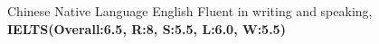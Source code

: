\begin{cvhonors}
  \cvhonor
    {Chinese}
    {Native Language}
    {}
    {}
  \cvhonor
    {English}
    {Fluent in writing and speaking, \textbf{IELTS(Overall:6.5, R:8, S:5.5, L:6.0, W:5.5)}}
    {}
    {}
\end{cvhonors}
